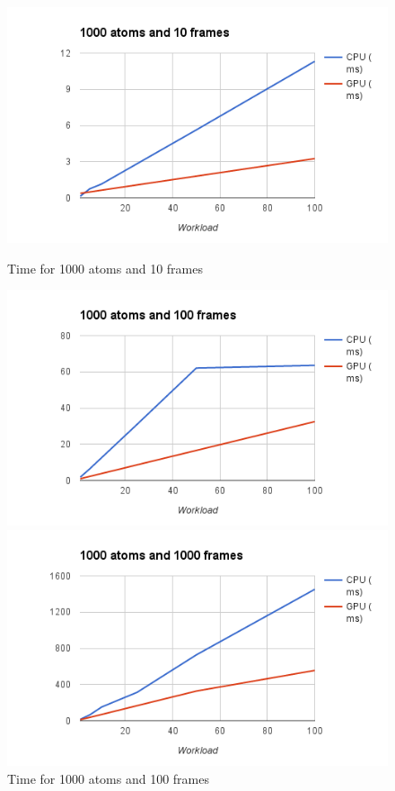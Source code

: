 \documentclass[11pt,a4paper]{report}
\begin{document}
\begin{figure}[!tbp]
  \centering
  \begin{minipage}[b]{0.4\textwidth}
    \includegraphics[width=\textwidth]{images/exp_1000_10}
    \caption{Time for 1000 atoms and 10 frames}
    \label{fg:exp_1000_10}
  \end{minipage}
  \hfill
  \begin{minipage}[b]{0.4\textwidth}
    \includegraphics[width=\textwidth]{images/exp_1000_100}
    \caption{Time for 1000 atoms and 100 frames}
     \label{fg:exp_1000_100}
  \end{minipage}
\hfill
  \begin{minipage}[b]{0.4\textwidth}
    \includegraphics[width=\textwidth]{images/exp_1000_1000}

\end{minipage}
\end{figure}
\end{document}
